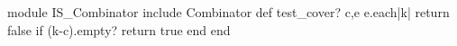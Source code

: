 \begin{rubyblock}
module IS_Combinator
  include Combinator
  def test_cover? c,e
    e.each{|k| return false if (k-c).empty?}
    return true
  end
end
\end{rubyblock}

